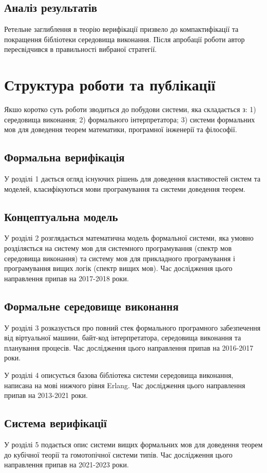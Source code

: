 \subsection{Аналіз результатів}
Ретельне заглиблення в теорію верифікації призвело до компактифікації
та покращення бібліотеки середовища виконання. Після апробації роботи
автор пересвідчився в правильності вибраної стратегії.

\newpage
\section{Структура роботи та публікації}
Якшо коротко суть роботи зводиться до побудови системи, яка складається з:
1) середовища виконання;
2) формального інтерпретатора;
3) системи формальних мов для доведення теорем математики, програмної інженерії та філософії.

\subsection*{Формальна верифікація}
У розділі 1 дається огляд існуючих рішень для доведення
властивостей систем та моделей, класифікуються мови програмування
та системи доведення теорем.

\subsection*{Концептуальна модель}
У розділі 2 розглядається математична модель формальної системи,
яка умовно розділяється на систему мов для системного
програмування (спектр мов середовища виконання) та систему мов для
прикладного програмування і програмування вищих логік (спектр вищих мов).
Час дослідження цього направлення припав на 2017-2018 роки.

\subsection*{Формальне середовище виконання}
У розділі 3 розказується про повний стек формального програмного забезпечення
від віртуальної машини, байт-код інтерпретатора, середовища виконання
та планування процесів. Час дослідження цього направлення припав на 2016-2017 роки.

У розділі 4 описується базова бібліотека системи середовища виконання,
написана на мові нижчого рівня Erlang.
Час дослідження цього направлення припав на 2013-2021 роки.

\newpage
\subsection*{Система верифікації}
У розділі 5 подається опис системи вищих формальних мов для доведення теорем до
кубічної теорії та гомотопічної системи типів.
Час дослідження цього направлення припав на 2021-2023 роки.

